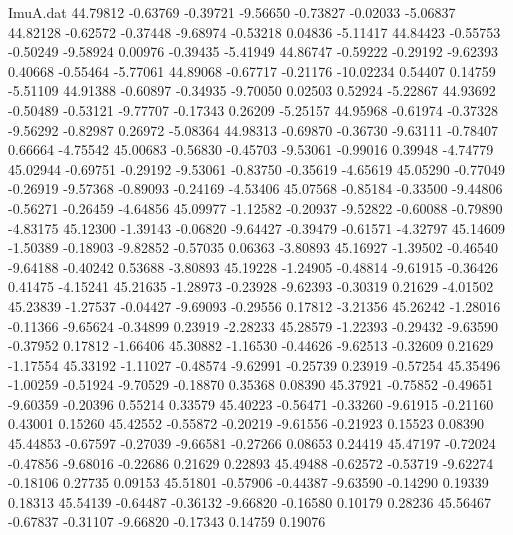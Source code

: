 \begin{filecontents}{ImuA.dat}
  44.79812   -0.63769   -0.39721   -9.56650   -0.73827   -0.02033   -5.06837
  44.82128   -0.62572   -0.37448   -9.68974   -0.53218    0.04836   -5.11417
  44.84423   -0.55753   -0.50249   -9.58924    0.00976   -0.39435   -5.41949
  44.86747   -0.59222   -0.29192   -9.62393    0.40668   -0.55464   -5.77061
  44.89068   -0.67717   -0.21176  -10.02234    0.54407    0.14759   -5.51109
  44.91388   -0.60897   -0.34935   -9.70050    0.02503    0.52924   -5.22867
  44.93692   -0.50489   -0.53121   -9.77707   -0.17343    0.26209   -5.25157
  44.95968   -0.61974   -0.37328   -9.56292   -0.82987    0.26972   -5.08364
  44.98313   -0.69870   -0.36730   -9.63111   -0.78407    0.66664   -4.75542
  45.00683   -0.56830   -0.45703   -9.53061   -0.99016    0.39948   -4.74779
  45.02944   -0.69751   -0.29192   -9.53061   -0.83750   -0.35619   -4.65619
  45.05290   -0.77049   -0.26919   -9.57368   -0.89093   -0.24169   -4.53406
  45.07568   -0.85184   -0.33500   -9.44806   -0.56271   -0.26459   -4.64856
  45.09977   -1.12582   -0.20937   -9.52822   -0.60088   -0.79890   -4.83175
  45.12300   -1.39143   -0.06820   -9.64427   -0.39479   -0.61571   -4.32797
  45.14609   -1.50389   -0.18903   -9.82852   -0.57035    0.06363   -3.80893
  45.16927   -1.39502   -0.46540   -9.64188   -0.40242    0.53688   -3.80893
  45.19228   -1.24905   -0.48814   -9.61915   -0.36426    0.41475   -4.15241
  45.21635   -1.28973   -0.23928   -9.62393   -0.30319    0.21629   -4.01502
  45.23839   -1.27537   -0.04427   -9.69093   -0.29556    0.17812   -3.21356
  45.26242   -1.28016   -0.11366   -9.65624   -0.34899    0.23919   -2.28233
  45.28579   -1.22393   -0.29432   -9.63590   -0.37952    0.17812   -1.66406
  45.30882   -1.16530   -0.44626   -9.62513   -0.32609    0.21629   -1.17554
  45.33192   -1.11027   -0.48574   -9.62991   -0.25739    0.23919   -0.57254
  45.35496   -1.00259   -0.51924   -9.70529   -0.18870    0.35368    0.08390
  45.37921   -0.75852   -0.49651   -9.60359   -0.20396    0.55214    0.33579
  45.40223   -0.56471   -0.33260   -9.61915   -0.21160    0.43001    0.15260
  45.42552   -0.55872   -0.20219   -9.61556   -0.21923    0.15523    0.08390
  45.44853   -0.67597   -0.27039   -9.66581   -0.27266    0.08653    0.24419
  45.47197   -0.72024   -0.47856   -9.68016   -0.22686    0.21629    0.22893
  45.49488   -0.62572   -0.53719   -9.62274   -0.18106    0.27735    0.09153
  45.51801   -0.57906   -0.44387   -9.63590   -0.14290    0.19339    0.18313
  45.54139   -0.64487   -0.36132   -9.66820   -0.16580    0.10179    0.28236
  45.56467   -0.67837   -0.31107   -9.66820   -0.17343    0.14759    0.19076

\end{filecontents}
